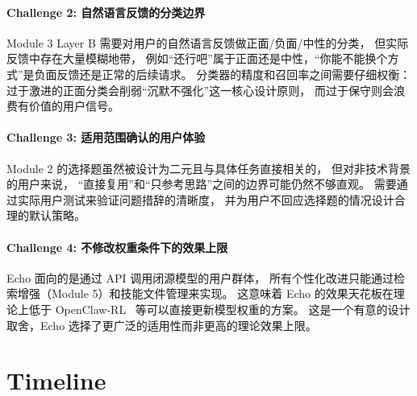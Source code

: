 \documentclass[12pt,a4paper]{article}
\begin{document}
	\paragraph{Challenge 2: 自然语言反馈的分类边界}
	Module 3 Layer B 需要对用户的自然语言反馈做正面/负面/中性的分类，
	但实际反馈中存在大量模糊地带，
	例如``还行吧''属于正面还是中性，``你能不能换个方式''是负面反馈还是正常的后续请求。
	分类器的精度和召回率之间需要仔细权衡：
	过于激进的正面分类会削弱``沉默不强化''这一核心设计原则，
	而过于保守则会浪费有价值的用户信号。
	
	\paragraph{Challenge 3: 适用范围确认的用户体验}
	Module 2 的选择题虽然被设计为二元且与具体任务直接相关的，
	但对非技术背景的用户来说，
	``直接复用''和``只参考思路''之间的边界可能仍然不够直观。
	需要通过实际用户测试来验证问题措辞的清晰度，
	并为用户不回应选择题的情况设计合理的默认策略。
	
	\paragraph{Challenge 4: 不修改权重条件下的效果上限}
	Echo 面向的是通过 API 调用闭源模型的用户群体，
	所有个性化改进只能通过检索增强（Module 5）和技能文件管理来实现。
	这意味着 Echo 的效果天花板在理论上低于
	OpenClaw-RL~\cite{openclaw_rl} 等可以直接更新模型权重的方案。
	这是一个有意的设计取舍，Echo 选择了更广泛的适用性而非更高的理论效果上限。
	
	
	\section{Timeline}
	
\end{document}
